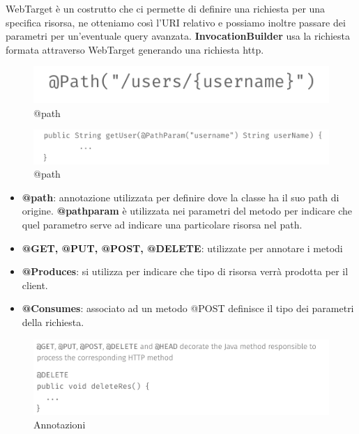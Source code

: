 \documentclass[12pt]{article}
\begin{document}
	WebTarget è un costrutto che ci permette di definire una richiesta per una specifica risorsa, ne otteniamo così l'URI relativo e possiamo inoltre passare dei parametri per un'eventuale query avanzata.
	\textbf{InvocationBuilder} usa la richiesta formata attraverso WebTarget generando una richiesta http. 
	\begin{figure}[h!]
		\centering
		\includegraphics[scale=0.40]{img/pat.png}
		\caption{@path}
	\end{figure} 
	\begin{figure}[h!]
		\centering
		\includegraphics[scale=0.40]{img/pat1.png}
		\caption{@path}
	\end{figure} 
	\begin{itemize}
		\item \textbf{@path}: annotazione utilizzata per definire dove la classe ha il suo path di origine. \textbf{@pathparam} è utilizzata nei parametri del metodo per indicare che quel parametro serve ad indicare una particolare risorsa nel path.  
		\item \textbf{@GET, @PUT, @POST, @DELETE}: utilizzate per annotare i metodi
		\item \textbf{@Produces}: si utilizza per indicare che tipo di risorsa verrà prodotta per il client.
		\item \textbf{@Consumes}: associato ad un metodo @POST definisce il tipo dei parametri della richiesta.
	\end{itemize}
	\begin{figure}[h!]
		\centering
		\includegraphics[scale=0.40]{img/annotation.png}
		\caption{Annotazioni}
	\end{figure} 
\end{document}
